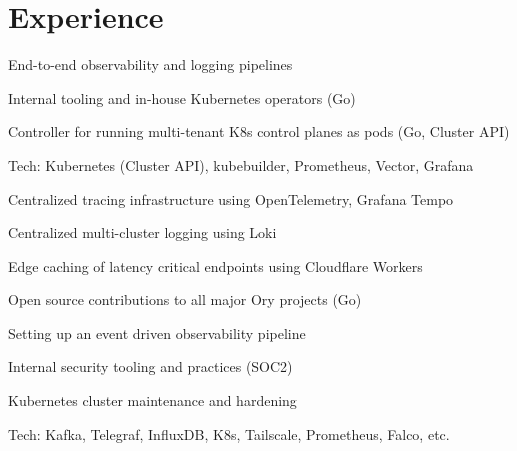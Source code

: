 \documentclass[]{config}
\begin{document}
\begin{minipage}[t]{0.66\textwidth} 


\section{Experience}

\vspace{\topsep} %
\vspace{\topsep} %
\vspace{\topsep} %
\begin{tightemize}
\item End-to-end observability and logging pipelines
\item Internal tooling and in-house Kubernetes operators (Go)
\item Controller for running multi-tenant K8s control planes as pods (Go, Cluster API)
\item Tech: Kubernetes (Cluster API), kubebuilder, Prometheus, Vector, Grafana
\end{tightemize}
\sectionsep


\vspace{\topsep} %
\begin{tightemize}
\item Centralized tracing infrastructure using OpenTelemetry, Grafana Tempo
\item Centralized multi-cluster logging using Loki
\item Edge caching of latency critical endpoints using Cloudflare Workers
\item Open source contributions to all major Ory projects (Go)
\end{tightemize}
\sectionsep


\vspace{\topsep} %
\begin{tightemize}
\item Setting up an event driven observability pipeline
\item Internal security tooling and practices (SOC2)
\item Kubernetes cluster maintenance and hardening
\item Tech: Kafka, Telegraf, InfluxDB, K8s, Tailscale, Prometheus, Falco, etc.
\end{tightemize}
\sectionsep



\end{minipage}
\end{document}
